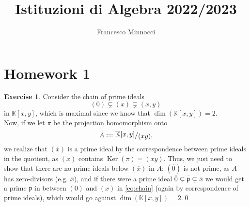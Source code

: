 \documentclass[a4paper]{article}
\title{Istituzioni di Algebra 2022/2023}
\author{Francesco Minnocci}
\newcommand{\K}{\mathbb{K}}
\newcommand{\ssfrac}[2]{
    \raisebox{+0.3ex}{$#1$}
    /
    \raisebox{-0.3ex}{$#2$}
}
\theoremstyle{definition}
\theoremstyle{definition}
\theoremstyle{remark}
\theoremstyle{definition}
\newtheorem{exercise}{Exercise}[section]
\begin{document}
\maketitle
\section*{Homework 1}
\setcounter{section}{1}
\begin{exercise}
	Consider the chain of prime ideals
	\begin{equation}\label{eq:chain}
		(0)\subsetneq\left(x  \right)\subsetneq (x,y)
	\end{equation}
	in  $\K\left[ x,y \right] $, which is maximal since we know that $\operatorname{dim}\left(
	\K[x,y] \right) =2$.\\
	Now, if we let $\pi$ be the projection homomorphism onto $$A:=\ssfrac{\K[x,y]}{(xy)},$$ we realize that $(\overline{x})$ is a prime ideal by the correspondence between prime ideals in
	the quotient, as $(x)$ contains
$\operatorname{Ker}\left( \pi \right) =(xy)$. Thus, we just need to show that there are no prime ideals below $(\overline{x})$ in $A$: $(\overline{0})$ is not prime, as $A$ has
zero-divisors (e.g. $\overline{x}$), and if there were a prime ideal $\overline{0}\subsetneq \overline{\mathfrak{p}}\subsetneq\overline{x}$ we would get a prime $\mathfrak{p}$ in between $(0)$
and $(x)$ in \eqref{eq:chain} (again by correspondence of prime ideals), which would go against $\operatorname{dim}\left( \K[x,y] \right) =2$.\qed
\end{exercise}
\end{document}
